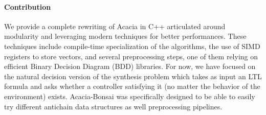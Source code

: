 \paragraph*{Contribution}
We provide a complete rewriting of Acacia in C++ articulated around modularity
and leveraging modern techniques for better performances. These techniques
include compile-time specialization of the algorithms, the use of SIMD
registers to store vectors, and several preprocessing steps, one of them
relying on efficient Binary Decision Diagram (BDD) libraries. For now, we have
focused on the natural decision version of the synthesis problem which takes as
input an LTL formula and asks whether a controller satisfying it (no matter
the behavior of the environment) exists. Acacia-Bonsai was specifically
designed to be able to easily try different antichain data structures as well
preprocessing pipelines.

